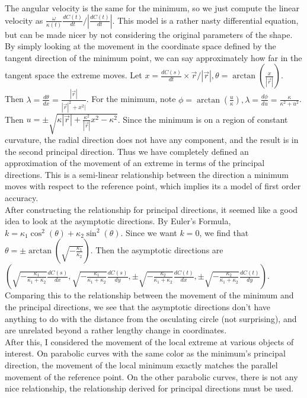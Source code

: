 \documentclass[12pt]{article}
\begin{document}
The angular velocity is the same for the minimum, so we just compute the linear velocity as $\frac{\omega}{\kappa(t)} \frac{dC(t)}{dt}/|\frac{dC(t)}{dt}|$.
This model is a rather nasty differential equation, but can be made nicer by not considering the original parameters of the shape.
By simply looking at the movement in the coordinate space defined by the tangent direction of the minimum point, we can say approximately how far in the tangent space the extreme moves.
Let $x=\frac{dC(s)}{dt}\times \vec{r}/|\vec{r}|, \theta =\arctan\left (\frac{x}{|\vec{r}|} \right)$.
Then $\lambda=\frac{d\theta}{dx}=\frac{|\vec{r}|}{|\vec{r}|^2+x^2|}$.
For the minimum, note $\phi=\arctan\left(\frac{u}{\kappa}\right), \lambda=\frac{d\phi}{du}=\frac{\kappa}{\kappa^2+u^2}$.
Then $u=\pm\sqrt{\kappa |\vec{r}|+\frac{\kappa^2}{|\vec{r}|}x^2-\kappa^2}$.
Since the minimum is on a region of constant curvature, the radial direction does not have any component, and the result is in the second principal direction.
Thus we have completely defined an approximation of the movement of an extreme in terms of the principal directions.
This is a semi-linear relationship between the direction a minimum moves with respect to the reference point, which implies its a model of first order accuracy.\\
After constructing the relationship for principal directions, it seemed like a good idea to look at the asymptotic directions.
By Euler's Formula, $k=\kappa_1\cos^2(\theta)+\kappa_2\sin^2(\theta)$.
Since we want $k=0$, we find that $\theta=\pm\arctan\left(\sqrt{-\frac{\kappa_1}{\kappa_2}}\right)$.
Then the asymptotic directions are \\$\left(\sqrt{-\frac{\kappa_1}{\kappa_1+\kappa_2}}\frac{dC(s)}{dx}, \sqrt{-\frac{\kappa_1}{\kappa_1+\kappa_2}}\frac{dC(s)}{dy}, \pm\sqrt{-\frac{\kappa_2}{\kappa_1+\kappa_2}}\frac{dC(t)}{dx}, \pm\sqrt{-\frac{\kappa_2}{\kappa_1+\kappa_2}}\frac{dC(t)}{dy}\right)$.
Comparing this to the relationship between the movement of the minimum and the principal directions, we see that the asymptotic directions don't have anything to do with the distance from the osculating circle (not surprising), and are unrelated beyond a rather lengthy change in coordinates.\\
After this, I considered the movement of the local extreme at various objects of interest.
On parabolic curves with the same color as the minimum's principal direction, the movement of the local minimum exactly matches the parallel movement of the reference point.
On the other parabolic curves, there is not any nice relationship, the relationship derived for principal directions must be used.
\end{document}

